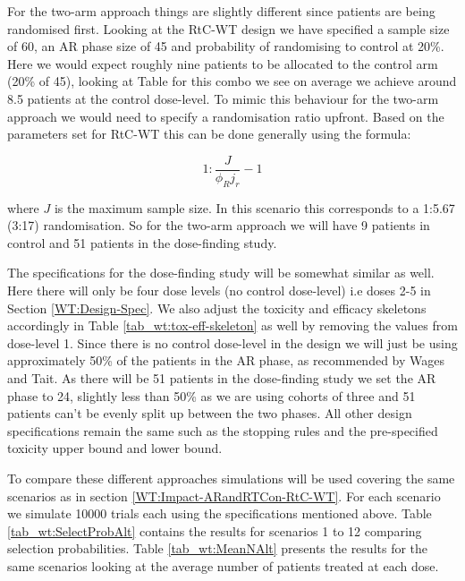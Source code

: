  For the two-arm approach things are slightly different since patients are being randomised first. Looking at the RtC-WT design we have specified a sample size of 60, an AR phase size of 45 and probability of randomising to control at 20\%. Here we would expect roughly nine patients to be allocated to the control arm (20\% of 45), looking at Table for this combo we see on average we achieve around 8.5 patients at the control dose-level. To mimic this behaviour for the two-arm approach we would need to specify a randomisation ratio upfront. Based on the parameters set for RtC-WT this can be done generally using the formula:
 
 \begin{equation}
 1 : \frac{J}{\phi_R j_r} - 1
 \end{equation}
 
 where $J$ is the maximum sample size. In this scenario this corresponds to a 1:5.67 (3:17) randomisation. So for the two-arm approach we will have 9 patients in control and 51 patients in the dose-finding study. 
 
 The specifications for the dose-finding study will be somewhat similar as well. Here there will only be four dose levels (no control dose-level) i.e doses 2-5 in Section \ref{WT:Design-Spec}. We also adjust the toxicity and efficacy skeletons accordingly in Table \ref{tab_wt:tox-eff-skeleton} as well by removing the values from dose-level 1. Since there is no control dose-level in the design we will just be using approximately 50\% of the patients in the AR phase, as recommended by Wages and Tait. As there will be 51 patients in the dose-finding study we set the AR phase to 24, slightly less than 50\% as we are using cohorts of three and 51 patients can't be evenly split up between the two phases. All other design specifications remain the same such as the stopping rules and the pre-specified toxicity upper bound and lower bound. 
 
 To compare these different approaches simulations will be used covering the same scenarios as in section \ref{WT:Impact-ARandRTCon-RtC-WT}. For each scenario we simulate 10000 trials each using the specifications mentioned above. Table \ref{tab_wt:SelectProbAlt} contains the results for scenarios 1 to 12 comparing selection probabilities. Table \ref{tab_wt:MeanNAlt} presents the results for the same scenarios looking at the average number of patients treated at each dose.  
 
